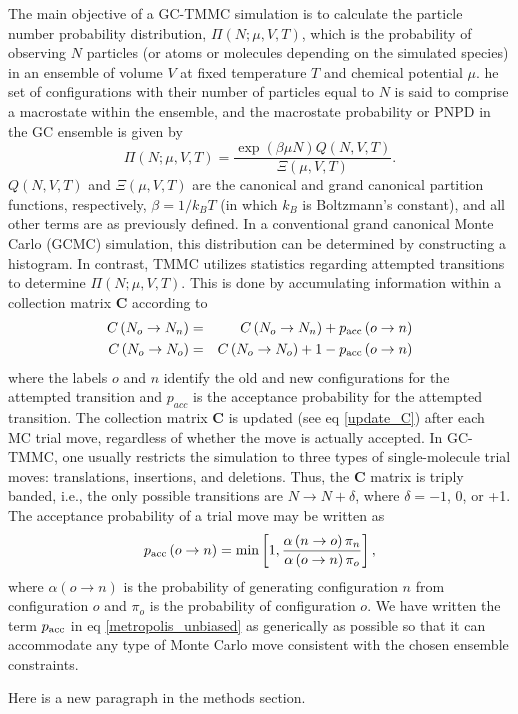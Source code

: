 The main objective of a GC-TMMC simulation is to calculate the particle number probability distribution, $\Pi \left(N;\mu,V,T\right)$, which is the probability of observing $N$ particles (or atoms or molecules depending on the simulated species) in an ensemble of volume $V$ at fixed temperature $T$ and chemical potential $\mu$.
he set of configurations with their number of particles equal to $N$ is said to comprise a macrostate within the ensemble, and the macrostate probability or PNPD in the GC ensemble is given by
%
\begin{equation}
  \Pi \left(N;\mu,V,T\right)
  = \dfrac{\exp\left(\beta \mu N\right) Q\left(N,V,T\right)}
     {\Xi\left(\mu,V,T\right)}.
  \label{GC_Pi_def}
\end{equation}
%
$Q\left(N,V,T\right)$ and $\Xi\left(\mu,V,T\right)$ are the canonical and grand canonical partition functions, respectively, $\beta = 1/k_B T$ (in which $k_B$ is Boltzmann's constant\cite{Mohr_CODATA_2012}), and all other terms are as previously defined.
In a conventional grand canonical Monte Carlo (GCMC) simulation, this distribution can be determined by constructing a histogram.
In contrast, TMMC utilizes statistics regarding attempted transitions to determine $\Pi \left(N;\mu,V,T\right)$.
This is done by accumulating information within a collection matrix $\mathbf{C}$ according to
%
\begin{eqnarray}
  C\left( N_o \rightarrow N_n \right) & = & 
  C\left( N_o \rightarrow N_n \right) + p_{\text{acc}}\left(o \rightarrow n\right) \nonumber \\
  C\left( N_o \rightarrow N_o \right) & = & 
  C\left( N_o \rightarrow N_o \right) + 1 - p_{\text{acc}}\left(o \rightarrow n\right)
  \label{update_C}
\end{eqnarray}
%
where the labels $o$ and $n$ identify the old and new configurations for the attempted transition and $p_{acc}$ is the acceptance probability for the attempted transition.
The collection matrix $\mathbf{C}$ is updated (see eq \ref{update_C}) after each MC trial move, regardless of whether the move is actually accepted.
In GC-TMMC, one usually restricts the simulation to three types of single-molecule trial moves: translations, insertions, and deletions.
Thus, the $\mathbf{C}$ matrix is triply banded, i.e., the only possible transitions are $N \rightarrow N + \delta $, where $\delta = -1$, 0, or +1.
The acceptance probability of a trial move may be written as\cite{Metropolis_Equations_1953,Hastings_Monte_1970}
%
\begin{equation}
  p_{\text{acc}}\left(o \rightarrow n\right) = \text{min}\left[1,
    \dfrac{\alpha\left(n \rightarrow o\right) \pi_{n}}
    {\alpha\left(o \rightarrow n\right) \pi_{o}}
      \right],
    \label{metropolis_unbiased}
\end{equation}
%
where $\alpha\left(o \rightarrow n\right)$ is the probability of generating configuration $n$ from configuration $o$ and $\pi_o$ is the probability of configuration $o$.
We have written the term $p_{\text{acc}}$ in eq \ref{metropolis_unbiased} as generically as possible so that it can accommodate any type of Monte Carlo move consistent with the chosen ensemble constraints.

Here is a new paragraph in the methods section.
